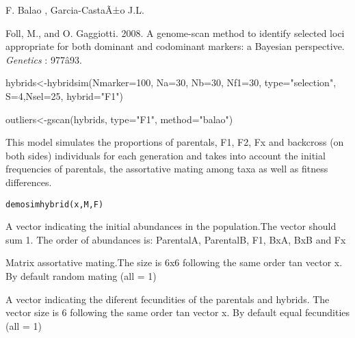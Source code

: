 \documentclass[letterpaper]{book}
\begin{document}
%
\begin{Author}\relax
F. Balao , Garcia-CastaÃ±o J.L.
\end{Author}
%
\begin{References}\relax
Foll, M., and O. Gaggiotti. 2008. A genome-scan method to identify selected loci appropriate for both dominant and codominant markers: a Bayesian perspective. \emph{Genetics} : 977â93. 
\end{References}
%
\begin{SeeAlso}\relax
{}
\end{SeeAlso}
%
\begin{Examples}
\begin{ExampleCode}
hybrids<-hybridsim(Nmarker=100, Na=30, Nb=30, Nf1=30, type="selection", S=4,Nsel=25, hybrid="F1")

outliers<-gscan(hybrids, type="F1", method="balao")
\end{ExampleCode}
\end{Examples}
%
\begin{Description}\relax
This model simulates the proportions of parentals,
F1, F2, Fx and backcross (on both sides) individuals for each generation and takes into account the initial frequencies of parentals, the assortative mating among taxa as well as fitness differences.
\end{Description}
%
\begin{Usage}
\begin{verbatim}
demosimhybrid(x,M,F)
\end{verbatim}
\end{Usage}
%
\begin{Arguments}
\begin{ldescription}

\item[\code{x}] 
A vector indicating the initial abundances in the population.The vector should sum 1. The order of abundances is: ParentalA, ParentalB, F1, BxA, BxB and Fx

\item[\code{M}] 
Matrix assortative mating.The size is 6x6 following the same order tan vector x. By default random mating (all = 1)

\item[\code{F}] 
A vector indicating the diferent fecundities of the parentals and hybrids. The vector size is 6 following the same order tan vector x. By default equal fecundities (all = 1)

\end{ldescription}
\end{Arguments}
\end{document}
